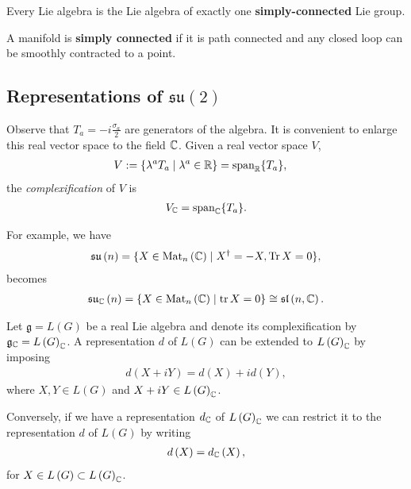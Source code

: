 \begin{proposition}
    Every Lie algebra is the Lie algebra of exactly one \textbf{simply-connected} Lie group.
\end{proposition}

\begin{definition}
    A manifold is \textbf{simply connected} if it is path connected and any closed loop can be smoothly contracted to a point.
\end{definition}

\subsection{Representations of $\mathfrak{su}\left( 2 \right) $}

Observe that $T_a = -i \frac{\sigma_a}{2}$ are generators of the algebra. It is convenient to enlarge this real vector space to the field $\mathbb{C}$. Given a real vector space $V$,
\begin{align}
    V &:= \{ \lambda^{a} T_a   \mid \lambda^{a} \in \mathbb{R}\} = \text{span}_{\mathbb{R}} \{T_a\} 
,\end{align}
the \textit{complexification} of $V$ is
\begin{align}
    V_{\mathbb{C}} = \text{span}_{\mathbb{C}} \{T_a\} 
.\end{align}

For example, we have
\begin{align}
    \mathfrak{su}\left( n \right) = \{X \in \text{Mat}_{n}\left( \mathbb{C} \right)  \mid X^{\dag} = - X, \Tr X = 0 \} 
,\end{align}
becomes
\begin{align}
    \mathfrak{su}_{\mathbb{C}}\left( n \right) = \{X \in \text{Mat}_{n}\left( \mathbb{C} \right)  \mid  \tr X = 0\} \cong \mathfrak{sl}\left( n, \mathbb{C} \right) 
.\end{align}

Let $\mathfrak{g} = L \left( G \right) $ be a real Lie algebra and denote its complexification by $\mathfrak{g}_{\mathbb{C}} = L \left( G \right)_{\mathbb{C}}$. A representation $d$ of $L \left( G \right) $ can be extended to $L \left( G \right)_{\mathbb{C}}$ by imposing 
\begin{align}
    d\left( X + i Y \right) = d\left( X \right) + i d \left( Y \right) 
,\end{align}
where $X, Y \in L \left( G \right) $ and $X + i Y \in L \left( G \right)_{\mathbb{C}}$.

Conversely, if we have a representation $d_{\mathbb{C}}$ of $L \left( G \right)_{\mathbb{C}}$ we can restrict it to the representation $d$ of $L \left( G \right) $ by writing
\begin{align}
    d \left( X \right) = d_{\mathbb{C}}\left( X \right) 
,\end{align}
for $X \in L \left( G \right) \subset L \left( G \right)_{\mathbb{C}}$.

